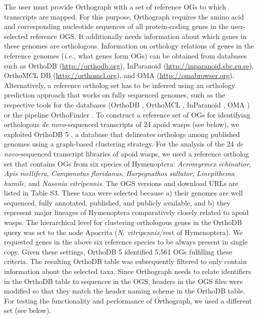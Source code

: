 The user must provide Orthograph with a set of reference OGs to which
transcripts are mapped. For this purpose, Orthograph requires the amino
acid and corresponding nucleotide sequences of all protein-coding genes
in the user-selected reference OGS. It additionally needs information
about which genes in these genomes are orthologous. Information on
orthology relations of genes in the reference genomes (\emph{i.e.}, what
genes form OGs) can be obtained from databases such as OrthoDB
(\url{http://orthodb.org}), InParanoid
(\url{http://inparanoid.sbc.su.se}), OrthoMCL DB
(\url{http://orthomcl.org}), and OMA (\url{http://omabrowser.org}).
Alternatively, a reference ortholog set has to be inferred using an
orthology prediction approach that works on fully sequenced genomes,
such as the respective tools for the databases (OrthoDB
\citep{Kriventseva2015}, OrthoMCL \citep{Li2003}, InParanoid
\citep{Sonnhammer2015}, OMA \citep{Altenhoff2015}) or the pipeline
OrthoFinder \citep{Emms2015}. To construct a reference set of OGs for
identifying orthologous \emph{de novo}-sequenced transcripts of 24 apoid
wasps (see below), we exploited OrthoDB 5 \citep{Waterhouse2011}, a
database that delineates orthologs among published genomes using a
graph-based clustering strategy. For the analysis of the 24 \emph{de
novo}-sequenced transcript libraries of apoid wasps, we used a reference
ortholog set that contains OGs from six species of Hymenoptera:
\emph{Acromyrmex echinatior}, \emph{Apis mellifera}, \emph{Camponotus
floridanus}, \emph{Harpegnathos saltator}, \emph{Linepithema humile},
and \emph{Nasonia vitripennis}. The OGS versions and download URLs are
listed in Table S3. These taxa were selected because a) their genomes
are well sequenced, fully annotated, published, and publicly available,
and b) they represent major lineages of Hymenoptera comparatively
closely related to apoid wasps. The hierarchical level for clustering
orthologous genes in the OrthoDB query was set to the node Apocrita
(\emph{N. vitripennis}/rest of Hymenoptera). We requested genes in the
above six reference species to be always present in single copy. Given
these settings, OrthoDB 5 identified 5,561 OGs fulfilling these
criteria. The resulting OrthoDB table was subsequently filtered to only
contain information about the selected taxa. Since Orthograph needs to
relate identifiers in the OrthoDB table to sequences in the OGS, headers
in the OGS files were modified so that they match the header naming
scheme in the OrthoDB table. For testing the functionality and
performance of Orthograph, we used a different set (see below).

